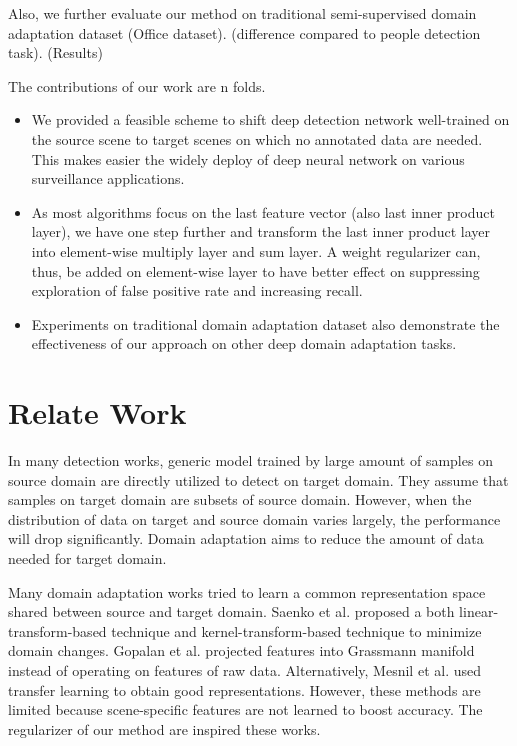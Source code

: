 \documentclass[runningheads]{llncs}
\begin{document}
\par
Also, we further evaluate our method on traditional semi-supervised domain adaptation dataset (Office dataset). (difference compared to people detection task). (Results)
\par
The contributions of our work are n folds.
\begin{itemize}
\item We provided a feasible scheme to shift deep detection network well-trained on the source scene to target scenes on which no annotated data are needed. This makes easier the widely deploy of deep neural network on various surveillance applications.
\item As most algorithms focus on the last feature vector (also last inner product layer), we have one step further and transform the last inner product layer into element-wise multiply layer and sum layer. A weight regularizer can, thus, be added on element-wise layer to have better effect on suppressing exploration of false positive rate and increasing recall.
\item Experiments on traditional domain adaptation dataset also demonstrate the effectiveness of our approach on other deep domain adaptation tasks.
\end{itemize}

\section{Relate Work}
\par
In many detection works, generic model trained by large amount of samples on source domain are directly utilized to detect on target domain. They assume that samples on target domain are subsets of source domain. However, when the distribution of data on target and source domain varies largely, the performance will drop significantly. Domain adaptation aims to reduce the amount of data needed for target domain.

Many domain adaptation works tried to learn a common representation space shared between source and target domain. Saenko et al. \cite{saenko2010adapting,kulis2011you} proposed a both linear-transform-based technique and kernel-transform-based technique to minimize domain changes. Gopalan et al. \cite{gopalan2011domain} projected features into Grassmann manifold instead of operating on features of raw data. Alternatively, Mesnil et al. \cite{mesnil2012unsupervised} used transfer learning to obtain good representations. However, these methods are limited because scene-specific features are not learned to boost accuracy. The regularizer of our method are inspired these works.
\end{document}
